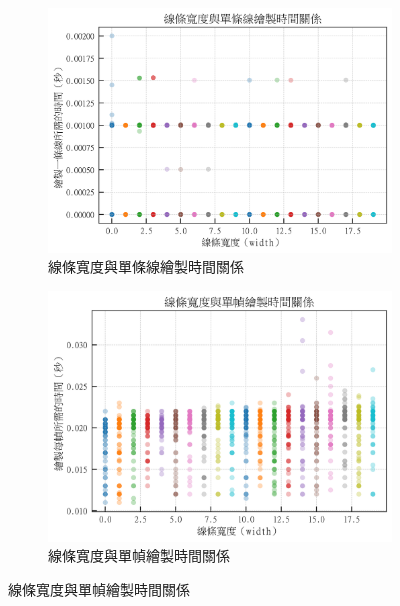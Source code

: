 \documentclass[12pt]{article}
\begin{document}
\begin{figure}[htbp]
  \centering
  \begin{subfigure}{0.45\textwidth}
      \centering
      \includegraphics[width=\linewidth]{img/OutputImg/_Time_l-w.png} %
      \caption{線條寬度與單條線繪製時間關係}
  \end{subfigure}
  \begin{subfigure}{0.45\textwidth}
      \centering
      \includegraphics[width=\linewidth]{img/OutputImg/_Time_f-w.png} %
      \caption{線條寬度與單幀繪製時間關係}
  \end{subfigure}
  

\end{figure}
\end{document}
